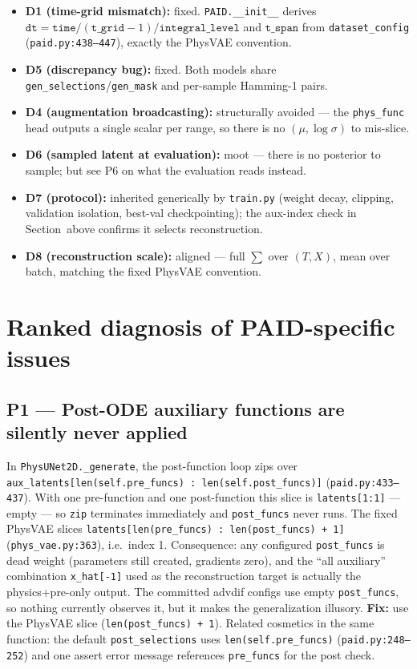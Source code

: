 \documentclass[11pt,a4paper]{article}
\newcommand{\code}[1]{\texttt{#1}}
\begin{document}
\begin{itemize}[nosep]
  \item \textbf{D1 (time-grid mismatch):} fixed. \code{PAID.\_\_init\_\_} derives
        $\code{dt} = \code{time}/(\code{t\_grid}-1)/\code{integral\_level}$ and
        $\code{t\_span}$ from \code{dataset\_config}
        (\code{paid.py:438--447}), exactly the PhysVAE convention.
  \item \textbf{D5 (discrepancy bug):} fixed. Both models share
        \code{gen\_selections}/\code{gen\_mask} and per-sample Hamming-1 pairs.
  \item \textbf{D4 (augmentation broadcasting):} structurally avoided --- the
        \code{phys\_func} head outputs a single scalar per range, so there is no
        $(\mu, \log\sigma)$ to mis-slice.
  \item \textbf{D6 (sampled latent at evaluation):} moot --- there is no posterior
        to sample; but see P6 on what the evaluation reads instead.
  \item \textbf{D7 (protocol):} inherited generically by \code{train.py}
        (weight decay, clipping, validation isolation, best-val checkpointing);
        the aux-index check in Section~above confirms it selects reconstruction.
  \item \textbf{D8 (reconstruction scale):} aligned --- full $\sum$ over
        $(T, X)$, mean over batch, matching the fixed PhysVAE convention.
\end{itemize}

\section{Ranked diagnosis of PAID-specific issues}
\label{sec:diagnosis}

\subsection*{P1 --- Post-ODE auxiliary functions are silently never applied}

In \code{PhysUNet2D.\_generate}, the post-function loop zips over
\code{aux\_latents[len(self.pre\_funcs) : len(self.post\_funcs)]}
(\code{paid.py:433--437}). With one pre-function and one post-function this slice is
\code{latents[1:1]} --- empty --- so \code{zip} terminates immediately and
\code{post\_funcs} never runs. The fixed PhysVAE slices
\code{latents[len(pre\_funcs) : len(post\_funcs) + 1]}
(\code{phys\_vae.py:363}), i.e.\ index 1. Consequence: any configured
\code{post\_funcs} is dead weight (parameters still created, gradients zero), and
the ``all auxiliary'' combination \code{x\_hat[-1]} used as the reconstruction
target is actually the physics+pre-only output. The committed advdif configs use
empty \code{post\_funcs}, so nothing currently observes it, but it makes the
generalization illusory. \textbf{Fix:} use the PhysVAE slice
(\code{len(post\_funcs) + 1}). Related cosmetics in the same function: the default
\code{post\_selections} uses \code{len(self.pre\_funcs)}
(\code{paid.py:248--252}) and one assert error message references
\code{pre\_funcs} for the post check.
\end{document}
